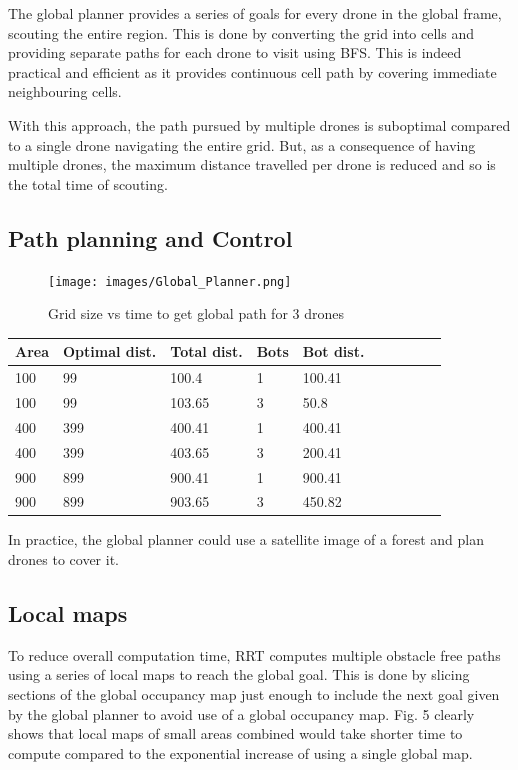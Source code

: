 The global planner provides a series of goals for every drone in the global frame, scouting the entire region. This is done by converting the grid into cells and providing separate paths for each drone to visit using BFS. This is indeed practical and efficient as it provides continuous cell path by covering immediate neighbouring cells.

With this approach, the path pursued by multiple drones is suboptimal compared to a single drone navigating the entire grid. But, as a consequence of having multiple drones, the maximum distance travelled per drone is reduced and so is the total time of scouting.

\subsection{Path planning and Control}

\begin{figure}[h]
\centering
\texttt{[image: images/Global\_Planner.png]}
\caption{Grid size vs time to get global path for 3 drones}
\end{figure}

\begin{table}[!ht]
    \centering
    \begin{tabular}{|l|l|l|l|l|l|l|l|l|l|}
    \hline
        Area & Optimal dist. & Total dist. & Bots & Bot dist.\\ \hline
        100 & 99 & 100.4 & 1 & 100.41 \\ \hline
        100 & 99 & 103.65 & 3 & 50.8 \\ \hline
        400 & 399 & 400.41 & 1 & 400.41 \\ \hline
        400 & 399 & 403.65 & 3 & 200.41 \\ \hline
        900 & 899 & 900.41 & 1 & 900.41 \\ \hline
        900 & 899 & 903.65 & 3 & 450.82 \\ \hline
    \end{tabular}
\end{table}

In practice, the global planner could use a satellite image of a forest and plan drones to cover it. 


\subsection{Local maps}

To reduce overall computation time, RRT computes multiple obstacle free paths
using a series of local maps to reach the global goal. This is done by slicing sections of the global occupancy map just enough to include the next goal given by the global planner to avoid use of a global occupancy map. Fig. 5 clearly shows that local maps of small areas combined would take shorter time to compute compared to the exponential increase of using a single global map.

